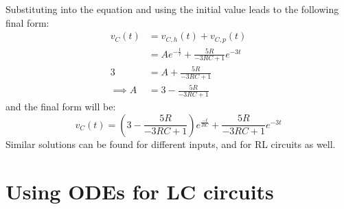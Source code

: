 \documentclass[nobib]{tufte-handout}
\begin{document}
Substituting into the equation and using the initial value leads to the following final form:
\begin{align*}
    v_C(t)     & = v_{C,h}(t) + v_{C,p}(t)                       \\
               & = Ae^{-\frac{t}{\tau}}+\frac{5R}{-3RC+1}e^{-3t} \\
    3          & =A+\frac{5R}{-3RC+1}                            \\
    \implies A & =3-\frac{5R}{-3RC+1}
\end{align*}
and the final form will be:
\begin{equation*}
    v_C(t) = \left(3-\frac{5R}{-3RC+1}\right)e^{\frac{-t}{RC}}+\frac{5R}{-3RC+1}e^{-3t}
\end{equation*}
Similar solutions can be found for different inputs, and for RL circuits as well.
\section{Using ODEs for LC circuits}
\end{document}
